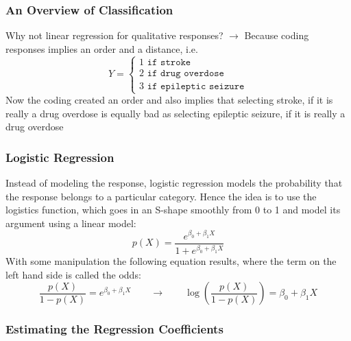 \subsubsection{An Overview of Classification}
Why not linear regression for qualitative responses? $\rightarrow$ Because  coding  responses  implies  an order  and  a  distance, i.e. 
\[ Y = \begin{cases} 
1\texttt{ if stroke} \\ 2\texttt{ if drug overdose} \\ 3\texttt{ if epileptic seizure} 
\end{cases}  \]
Now the coding created an  order and also implies that  selecting  stroke,  if  it  is  really  a drug  overdose  is  equally  bad  as  selecting epileptic  seizure,  if  it  is  really  a  drug overdose \\

\subsubsection{Logistic Regression}
Instead  of modeling  the response,  logistic  regression models  the  probability  that  the response  belongs  to  a  particular category.
Hence the idea is  to  use  the  logistics function,  which goes  in  an S-shape smoothly  from  0  to 1  and  model  its argument  
using  a  linear  model:
\[ p(X) = \frac{e^{\beta_0+\beta_1X}}{1+e^{\beta_0+\beta_1X}}  \]
With some  manipulation the following  equation  results,  where  the term  on the  left  hand  side  is  called the  odds:
\[ \frac{p(X)}{1-p(X)} = e^{\beta_0+\beta_1X} \qquad \rightarrow \qquad \log \left( \frac{p(X)}{1-p(X)} \right) = \beta_0+\beta_1X\]

\subsubsection{Estimating the Regression Coefficients} 
